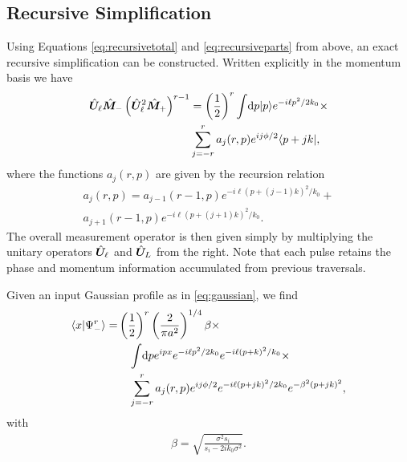 
%
%

\begin{appendices}
\section{Recursive Simplification}\label{sec:recursiveappendix}
Using Equations \eqref{eq:recursivetotal} and \eqref{eq:recursiveparts} from above, an exact recursive simplification can be constructed.  Written explicitly in the momentum basis we have 
\begin{align}
\nonumber\hat{\bm U}_\ell\hat{\bm M}_-\left(\hat{\bm U}_\ell^2 \hat{\bm M}_+\right)^{r-1} &= \left(\frac{1}{2}\right)^{r}\int\! \mathrm{d}p\lvert p\rangle e^{-i\ell p^2/2k_0} \times \\ &\sum^r_{j=-r}a_j(r,p) e^{ij\phi/2}\langle p + jk \rvert,
\end{align} 
where the functions $a_j(r,p)$ are given by the recursion relation
\begin{align}
\nonumber a_{j}(r,p) = a_{j-1}(r-1,p)e^{-i\ell(p+(j-1)k)^2/k_0} +\\ a_{j+1}(r-1,p)e^{-i\ell(p+(j+1)k)^2/k_0}.
\end{align}
The overall measurement operator is then given simply by multiplying the unitary operators $\hat{\bm U}_\ell$ and $\hat{\bm U}_L$ from the right.  Note that each pulse retains the phase and momentum information accumulated from previous traversals.   

Given an input Gaussian profile as in \eqref{eq:gaussian}, we find 
\begin{align}\label{eq:exactsolution}
\langle x \vert \Psi_-^r \rangle =& \left(\frac{1}{2}\right)^{r}\left(\frac{2}{\pi a^2}\right)^{1/4} \beta \times \\
&\quad \int \!\mathrm{d}p e^{ipx} e^{-i\ell p^2/2k_0}e^{-i\ell (p+k)^2/k_0}  \times \nonumber \\
&\quad \sum_{j=-r}^{r}a_j(r,p)e^{ij\phi/2}e^{-i\ell(p+jk)^2/2k_0}e^{-\beta^2(p+jk)^2}, \nonumber 
\end{align}
with 
\begin{align}
\beta = \sqrt{\frac{\sigma^2 s_i}{s_i - 2ik_0\sigma^2}}.
\end{align} 


\end{appendices}
